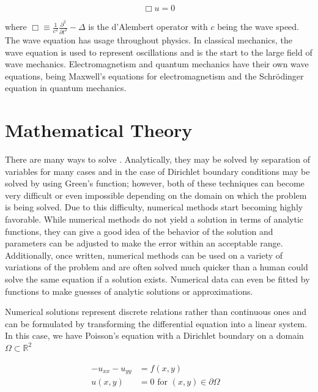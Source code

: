 \documentclass[10pt,a4paper]{article}
\begin{document}
\begin{equation}
\Box u = 0 \label{eqn: wave}
\end{equation}

where $\Box \equiv \frac{1}{c^2} \frac{\partial^2}{\partial t^2} - \Delta$ is the d'Alembert operator with $c$ being the wave speed. The wave equation has usage throughout physics. In classical mechanics, the wave equation is used to represent oscillations and is the start to the large field of wave mechanics. Electromagnetism and quantum mechanics have their own wave equations, being Maxwell's equations for electromagnetism and the Schr{\"o}dinger equation in quantum mechanics.

\section*{Mathematical Theory}
There are many ways to solve . Analytically, they may be solved by separation of variables for many cases and in the case of Dirichlet boundary conditions may be solved by using Green's function; however, both of these techniques can become very difficult or even impossible depending on the domain on which the problem is being solved. Due to this difficulty, numerical methods start becoming highly favorable. While numerical methods do not yield a solution in terms of analytic functions, they can give a good idea of the behavior of the solution and parameters can be adjusted to make the error within an acceptable range. Additionally, once written, numerical methods can be used on a variety of variations of the problem and are often solved much quicker than a human could solve the same equation if a solution exists. Numerical data can even be fitted by functions to make guesses of analytic solutions or approximations.

Numerical solutions represent discrete relations rather than continuous ones and can be formulated by transforming the differential equation into a linear system. In this case, we have Poisson's equation with a Dirichlet boundary on a domain $\Omega \subset \mathbb{R}^2$

\begin{subequations}
  \begin{align}
  -u_{xx} - u_{yy} &= f(x, y) & \\
  u(x, y) &= 0 \,\, \text{for} \,\, (x, y) \in \partial \Omega
  \end{align}
\end{subequations}
\end{document}
